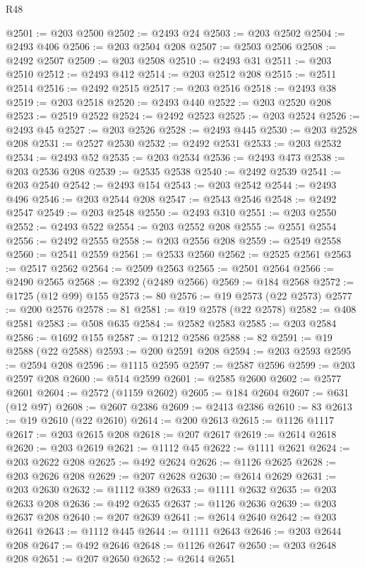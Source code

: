 \begin{lexlean}{R48}
\begin{coremodule}
@2501 := @203 @2500
@2502 := @2493 @24
@2503 := @203 @2502
@2504 := @2493 @406
@2506 := @203 @2504 @208
@2507 := @2503 @2506
@2508 := @2492 @2507
@2509 := @203 @2508
@2510 := @2493 @31
@2511 := @203 @2510
@2512 := @2493 @412
@2514 := @203 @2512 @208
@2515 := @2511 @2514
@2516 := @2492 @2515
@2517 := @203 @2516
@2518 := @2493 @38
@2519 := @203 @2518
@2520 := @2493 @440
@2522 := @203 @2520 @208
@2523 := @2519 @2522
@2524 := @2492 @2523
@2525 := @203 @2524
@2526 := @2493 @45
@2527 := @203 @2526
@2528 := @2493 @445
@2530 := @203 @2528 @208
@2531 := @2527 @2530
@2532 := @2492 @2531
@2533 := @203 @2532
@2534 := @2493 @52
@2535 := @203 @2534
@2536 := @2493 @473
@2538 := @203 @2536 @208
@2539 := @2535 @2538
@2540 := @2492 @2539
@2541 := @203 @2540
@2542 := @2493 @154
@2543 := @203 @2542
@2544 := @2493 @496
@2546 := @203 @2544 @208
@2547 := @2543 @2546
@2548 := @2492 @2547
@2549 := @203 @2548
@2550 := @2493 @310
@2551 := @203 @2550
@2552 := @2493 @522
@2554 := @203 @2552 @208
@2555 := @2551 @2554
@2556 := @2492 @2555
@2558 := @203 @2556 @208
@2559 := @2549 @2558
@2560 := @2541 @2559
@2561 := @2533 @2560
@2562 := @2525 @2561
@2563 := @2517 @2562
@2564 := @2509 @2563
@2565 := @2501 @2564
@2566 := @2490 @2565
@2568 := @2392 (@2489 @2566)
@2569 := @184 @2568
@2572 := @1725 (@12 @99) @155
@2573 := 80
@2576 := @19 @2573 (@22 @2573)
@2577 := @200 @2576
@2578 := 81
@2581 := @19 @2578 (@22 @2578)
@2582 := @408 @2581
@2583 := @508 @635
@2584 := @2582 @2583
@2585 := @203 @2584
@2586 := @1692 @155
@2587 := @1212 @2586
@2588 := 82
@2591 := @19 @2588 (@22 @2588)
@2593 := @200 @2591 @208
@2594 := @203 @2593
@2595 := @2594 @208
@2596 := @1115 @2595
@2597 := @2587 @2596
@2599 := @203 @2597 @208
@2600 := @514 @2599
@2601 := @2585 @2600
@2602 := @2577 @2601
@2604 := @2572 (@1159 @2602)
@2605 := @184 @2604
@2607 := @631 (@12 @97)
@2608 := @2607 @2386
@2609 := @2413 @2386
@2610 := 83
@2613 := @19 @2610 (@22 @2610)
@2614 := @200 @2613
@2615 := @1126 @1117
@2617 := @203 @2615 @208
@2618 := @207 @2617
@2619 := @2614 @2618
@2620 := @203 @2619
@2621 := @1112 @45
@2622 := @1111 @2621
@2624 := @203 @2622 @208
@2625 := @492 @2624
@2626 := @1126 @2625
@2628 := @203 @2626 @208
@2629 := @207 @2628
@2630 := @2614 @2629
@2631 := @203 @2630
@2632 := @1112 @389
@2633 := @1111 @2632
@2635 := @203 @2633 @208
@2636 := @492 @2635
@2637 := @1126 @2636
@2639 := @203 @2637 @208
@2640 := @207 @2639
@2641 := @2614 @2640
@2642 := @203 @2641
@2643 := @1112 @445
@2644 := @1111 @2643
@2646 := @203 @2644 @208
@2647 := @492 @2646
@2648 := @1126 @2647
@2650 := @203 @2648 @208
@2651 := @207 @2650
@2652 := @2614 @2651

\end{coremodule}
\end{lexlean}
